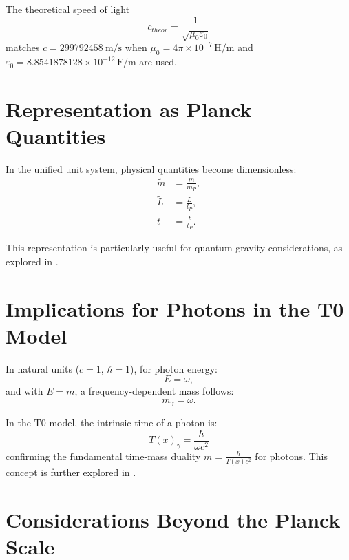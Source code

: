 \documentclass[12pt,a4paper]{article}
\newcommand{\Tfield}{T(x)}
\begin{document}
	The theoretical speed of light
	\begin{equation}
		c_{theor} = \frac{1}{\sqrt{\mu_0 \varepsilon_0}}
	\end{equation}
	matches \(c = \SI{299792458}{\meter\per\second}\) when \(\mu_0 = 4\pi \times 10^{-7} \, \si{\henry\per\meter}\) and \(\varepsilon_0 = 8.8541878128 \times 10^{-12} \, \si{\farad\per\meter}\) are used.
	
	\section{Representation as Planck Quantities}
	\label{sec:planck_quantities}
	
	In the unified unit system, physical quantities become dimensionless:
	\begin{align}
		\tilde{m} &= \frac{m}{m_P}, \\
		\tilde{L} &= \frac{L}{l_P}, \\
		\tilde{t} &= \frac{t}{t_P}.
	\end{align}
	
	This representation is particularly useful for quantum gravity considerations, as explored in \cite{pascher_planck_2025}.
	
	\section{Implications for Photons in the T0 Model}
	\label{sec:photons}
	
	In natural units (\(c = 1\), \(\hbar = 1\)), for photon energy:
	\begin{equation}
		E = \omega,
	\end{equation}
	and with \(E = m\), a frequency-dependent mass follows:
	\begin{equation}
		m_{\gamma} = \omega.
	\end{equation}
	
	In the T0 model, the intrinsic time of a photon is:
	\begin{equation}
		\Tfield_{\gamma} = \frac{\hbar}{\omega c^2}
	\end{equation}
	confirming the fundamental time-mass duality \(m = \frac{\hbar}{\Tfield c^2}\) for photons. This concept is further explored in \cite{pascher_photons_2025}.
	
	\section{Considerations Beyond the Planck Scale}
	\label{sec:beyond_planck}
	
\end{document}
